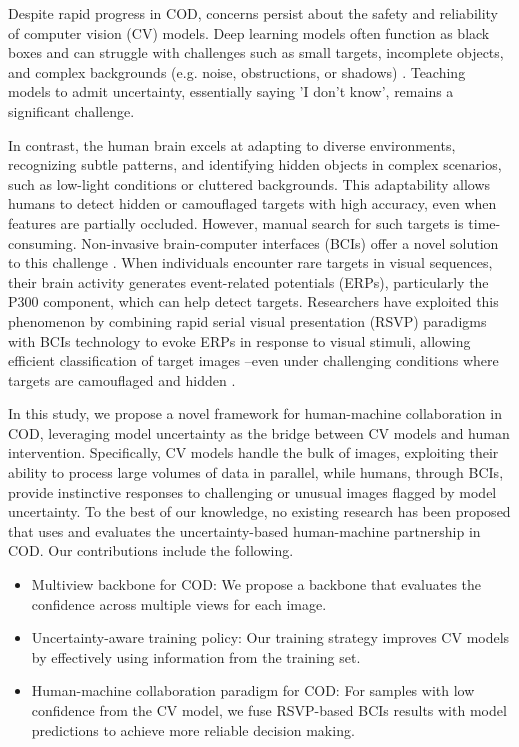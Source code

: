 \documentclass[preprint,12pt,authoryear]{elsarticle}
\begin{document}
Despite rapid progress in COD, concerns persist about the safety and reliability of computer vision (CV) models. Deep learning models often function as black boxes \cite{hassija2024interpreting} and can struggle with challenges such as small targets, incomplete objects, and complex backgrounds (e.g. noise, obstructions, or shadows) \cite{bi2021rethinking}. Teaching models to admit uncertainty, essentially saying 'I don't know', remains a significant challenge.

In contrast, the human brain excels at adapting to diverse environments, recognizing subtle patterns, and identifying hidden objects in complex scenarios, such as low-light conditions or cluttered backgrounds. This adaptability allows humans to detect hidden or camouflaged targets with high accuracy, even when features are partially occluded. However, manual search for such targets is time-consuming. Non-invasive brain-computer interfaces (BCIs) offer a novel solution to this challenge \cite{kim2019high}. When individuals encounter rare targets in visual sequences, their brain activity generates event-related potentials (ERPs), particularly the P300 component, which can help detect targets. Researchers have exploited this phenomenon by combining rapid serial visual presentation (RSVP) paradigms with BCIs technology to evoke ERPs in response to visual stimuli, allowing efficient classification of target images \cite{zhang2020benchmark}--even under challenging conditions where targets are camouflaged and hidden \cite{lian2023eeg, zhou2024rsvp}. 

In this study, we propose a novel framework for human-machine collaboration in COD, leveraging model uncertainty as the bridge between CV models and human intervention. Specifically, CV models handle the bulk of images, exploiting their ability to process large volumes of data in parallel, while humans, through BCIs, provide instinctive responses to challenging or unusual images flagged by model uncertainty. To the best of our knowledge, no existing research has been proposed that uses and evaluates the uncertainty-based human-machine partnership in COD. Our contributions include the following.

\begin{itemize}
    \item Multiview backbone for COD: We propose a backbone that evaluates the confidence across multiple views for each image.
    \item Uncertainty-aware training policy: Our training strategy improves CV models by effectively using information from the training set.
    \item Human-machine collaboration paradigm for COD: For samples with low confidence from the CV model, we fuse RSVP-based BCIs results with model predictions to achieve more reliable decision making.
\end{itemize}
\end{document}
